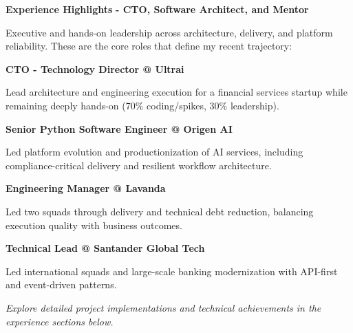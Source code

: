 \documentclass[a4paper,10pt]{article}
\begin{document}
\vspace{0.4cm}
\noindent
\begin{minipage}{\textwidth}
	{\large\bfseries\color{darkblue}\selectfont Experience Highlights}
	{\small\bfseries\color{darkblue}\selectfont - CTO, Software Architect, and Mentor}
	\vspace{0.3cm}

	Executive and hands-on leadership across architecture, delivery, and platform reliability. These are the core roles that define my recent trajectory:

	\vspace{0.35cm}
	\begin{minipage}{0.48\textwidth}
		\noindent\textbf{CTO - Technology Director @ Ultrai}

		Lead architecture and engineering execution for a financial services startup while remaining deeply hands-on (70\% coding/spikes, 30\% leadership).

		\vspace{0.3cm}
		\noindent\textbf{Senior Python Software Engineer @ Origen AI}

		Led platform evolution and productionization of AI services, including compliance-critical delivery and resilient workflow architecture.
	\end{minipage}
	\hfill
	\begin{minipage}{0.48\textwidth}
		\noindent\textbf{Engineering Manager @ Lavanda}

		Led two squads through delivery and technical debt reduction, balancing execution quality with business outcomes.

		\vspace{0.3cm}
		\noindent\textbf{Technical Lead @ Santander Global Tech}

		Led international squads and large-scale banking modernization with API-first and event-driven patterns.


		\vspace{0.35cm}
		{\raggedleft\itshape \textit{Explore detailed project implementations and technical achievements in the experience sections below.}}
	\end{minipage}
\end{minipage}
\end{document}
